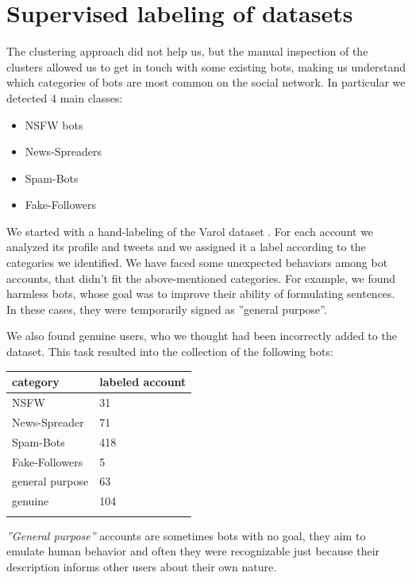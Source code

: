 \section{Supervised labeling of datasets}
The clustering approach did not help us, but the manual inspection of the clusters allowed us to get in touch with some existing bots, making us understand which categories of bots are most common on the social network. In particular we detected 4 main classes:
\begin{itemize}
	\item[\PencilRight]NSFW bots
	\item[\PencilRight]News-Spreaders
	\item[\PencilRight]Spam-Bots
	\item[\PencilRight]Fake-Followers
\end{itemize}

We started with a hand-labeling of the Varol dataset \cite{Varol}. For each account we analyzed its profile and tweets and we assigned it a label according to the categories we identified. We have faced some unexpected behaviors among bot accounts, that didn't fit the above-mentioned categories. For example, we found harmless bots, whose goal was to improve their ability of formulating sentences. In these cases, they were temporarily signed as ''general purpose''.

We also found genuine users, who we thought  had been incorrectly added to the dataset.
This task resulted into the collection of the following bots:

\begin{center}
	\begin{tabular}{ll}
		\\category&labeled account\\
		\hline\hline
		NSFW&31\\
		News-Spreader&71\\
		Spam-Bots&418\\
		Fake-Followers&5\\
		general purpose&63\\
		genuine&104\\\hline\\		
	\end{tabular}
\end{center}

\emph{''General purpose''} accounts are sometimes bots with no goal, they aim to emulate human behavior and often they were recognizable just because their description informs other users about their own nature.

